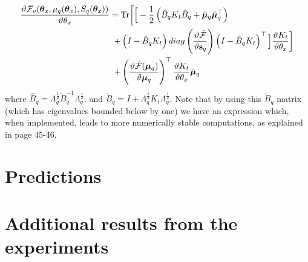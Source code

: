 \begin{align}
\frac{\vartheta \mathcal{F}_v(\boldsymbol \theta_x, \mu_q(\boldsymbol \theta_x), S_q(\boldsymbol \theta_x))}{\vartheta \theta_x}
={}& \text{Tr} \bigg[
\Big[ - \frac{1}{2} \left( \hat{B}_q K_t \hat{B}_q + \bar{\boldsymbol \mu}_q \bar{\boldsymbol \mu}_q^{\top} \right) \nonumber \\
+{}& \left( I - \hat{B}_q K_t \right)
 diag \left(  \frac{\vartheta \hat{\mathcal{F}}}{\vartheta \mathbf{s}_q} \right)
			 \left( I - \hat{B}_q K_t \right)^{\top} \Big]
			  \frac{\vartheta K_t}{\vartheta \theta_x} \bigg] 	\nonumber \\	
+{}&  \left( \frac{\vartheta \hat{\mathcal{F}}( \boldsymbol \mu_q)}{\vartheta \boldsymbol \mu_q} \right)^{\top}
					\frac{\vartheta K_t}{\vartheta \theta_x} \bar{\boldsymbol \mu}_q 
\label{CompleteBoundDerivThetatB}
\end{align}
where $\hat{B}_q = \Lambda_q^{\frac{1}{2}} \widetilde{B}_q^{-1} \Lambda_q^{\frac{1}{2}}$.
and $\tilde{B}_q = I + \Lambda_q^{\frac{1}{2}} K_t \Lambda_q^{\frac{1}{2}}$. Note that by using this
$\tilde{B}_q$ matrix (which has eigenvalues bounded below by one) we have an expression which, when implemented, leads to more numerically stable computations, as explained in \cite{rasmussen-williams} page 45-46. 




\section{Predictions}


\section{Additional results from the experiments}
